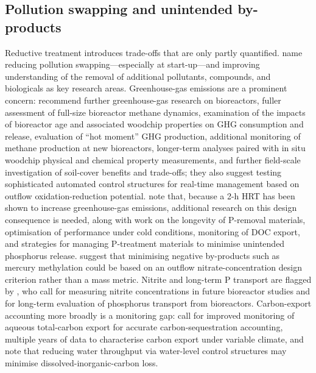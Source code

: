 \subsection{Pollution swapping and unintended by-products}
Reductive treatment introduces trade-offs that are only partly quantified. \textcite{Christianson2021} name reducing pollution swapping---especially at start-up---and improving understanding of the removal of additional pollutants, compounds, and biologicals as key research areas. Greenhouse-gas emissions are a prominent concern: \textcite{Brunton2024} recommend further greenhouse-gas research on bioreactors, fuller assessment of full-size bioreactor methane dynamics, examination of the impacts of bioreactor age and associated woodchip properties on GHG consumption and release, evaluation of ``hot moment'' GHG production, additional monitoring of methane production at new bioreactors, longer-term analyses paired with in situ woodchip physical and chemical property measurements, and further field-scale investigation of soil-cover benefits and trade-offs; they also suggest testing sophisticated automated control structures for real-time management based on outflow oxidation-reduction potential. \textcite{Strock2025} note that, because a 2-h HRT has been shown to increase greenhouse-gas emissions, additional research on this design consequence is needed, along with work on the longevity of P-removal materials, optimisation of performance under cold conditions, monitoring of DOC export, and strategies for managing P-treatment materials to minimise unintended phosphorus release. \textcite{Maxwell2022} suggest that minimising negative by-products such as mercury methylation could be based on an outflow nitrate-concentration design criterion rather than a mass metric. Nitrite and long-term P transport are flagged by \textcite{Bell2015}, who call for measuring nitrite concentrations in future bioreactor studies and for long-term evaluation of phosphorus transport from bioreactors. Carbon-export accounting more broadly is a monitoring gap: \textcite{Schilling2023} call for improved monitoring of aqueous total-carbon export for accurate carbon-sequestration accounting, multiple years of data to characterise carbon export under variable climate, and note that reducing water throughput via water-level control structures may minimise dissolved-inorganic-carbon loss.

